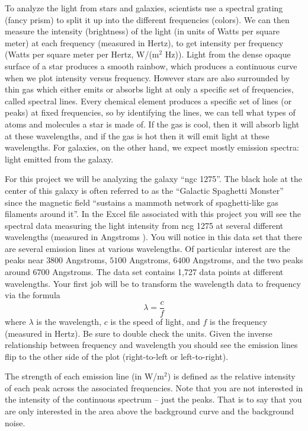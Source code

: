 \documentclass[
]{book}
\theoremstyle{definition}
\theoremstyle{definition}
\theoremstyle{definition}
\theoremstyle{remark}
\begin{document}
To analyze the light from stars and galaxies, scientists use a spectral
grating (fancy prism) to split it up into the different frequencies
(colors). We can then measure the intensity (brightness) of the light
(in units of Watts per square meter) at each frequency (measured in
Hertz), to get intensity per frequency (Watts per square meter per
Hertz, W/(m\(^2\) Hz)). Light from the dense opaque surface of a star
produces a smooth rainbow, which produces a continuous curve when we
plot intensity versus frequency. However stars are also surrounded by
thin gas which either emits or absorbs light at only a specific set of
frequencies, called spectral lines. Every chemical element produces a
specific set of lines (or peaks) at fixed frequencies, so by identifying
the lines, we can tell what types of atoms and molecules a star is made
of. If the gas is cool, then it will absorb light at these wavelengths,
and if the gas is hot then it will emit light at these wavelengths. For
galaxies, on the other hand, we expect mostly emission spectra: light
emitted from the galaxy.

For this project we will be analyzing the galaxy ``ngc 1275''. The black
hole at the center of this galaxy is often referred to as the ``Galactic
Spaghetti Monster'' since the magnetic field ``sustains a mammoth network
of spaghetti-like gas filaments around it''. In the Excel file
associated with this project you will see the spectral data measuring
the light intensity from ncg 1275 at several different wavelengths
(measured in Angstroms ). You will notice in this data set that there
are several emission lines at various wavelengths. Of particular
interest are the peaks near \(3800\) Angstroms, \(5100\) Angstroms, \(6400\)
Angstroms, and the two peaks around \(6700\) Angstroms. The data set
contains 1,727 data points at different wavelengths. Your first job will
be to transform the wavelength data to frequency via the formula
\[\lambda = \frac{c}{f}\] where \(\lambda\) is the wavelength, \(c\) is the
speed of light, and \(f\) is the frequency (measured in Hertz). Be sure to
double check the units. Given the inverse relationship between frequency
and wavelength you should see the emission lines flip to the other side
of the plot (right-to-left or left-to-right).

The strength of each emission line (in W/m\(^2\)) is defined as the
relative intensity of each peak across the associated frequencies. Note
that you are not interested in the intensity of the continuous spectrum
-- just the peaks. That is to say that you are only interested in the
area above the background curve and the background noise.
\end{document}
